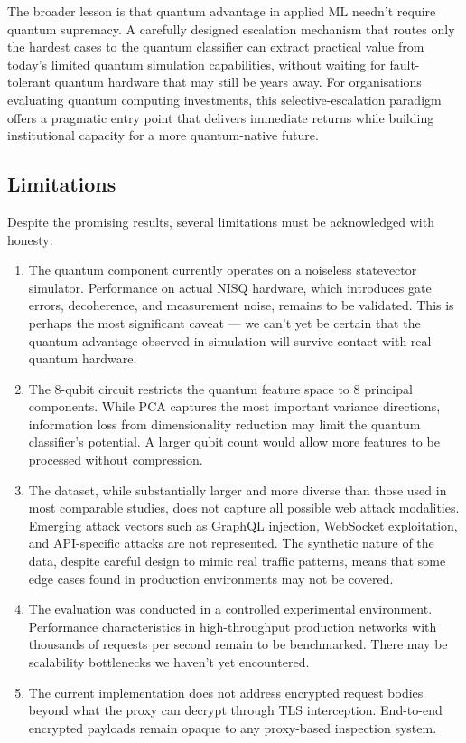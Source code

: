 \documentclass[journal,onecolumn]{IEEEtran}
\begin{document}
The broader lesson is that quantum advantage in applied ML needn't require quantum supremacy. A carefully designed escalation mechanism that routes only the hardest cases to the quantum classifier can extract practical value from today's limited quantum simulation capabilities, without waiting for fault-tolerant quantum hardware that may still be years away. For organisations evaluating quantum computing investments, this selective-escalation paradigm offers a pragmatic entry point that delivers immediate returns while building institutional capacity for a more quantum-native future.

\subsection{Limitations}
Despite the promising results, several limitations must be acknowledged with honesty:

\begin{enumerate}
\item[(a)] The quantum component currently operates on a noiseless statevector simulator. Performance on actual NISQ hardware, which introduces gate errors, decoherence, and measurement noise, remains to be validated. This is perhaps the most significant caveat --- we can't yet be certain that the quantum advantage observed in simulation will survive contact with real quantum hardware.

\item[(b)] The 8-qubit circuit restricts the quantum feature space to 8 principal components. While PCA captures the most important variance directions, information loss from dimensionality reduction may limit the quantum classifier's potential. A larger qubit count would allow more features to be processed without compression.

\item[(c)] The dataset, while substantially larger and more diverse than those used in most comparable studies, does not capture all possible web attack modalities. Emerging attack vectors such as GraphQL injection, WebSocket exploitation, and API-specific attacks are not represented. The synthetic nature of the data, despite careful design to mimic real traffic patterns, means that some edge cases found in production environments may not be covered.

\item[(d)] The evaluation was conducted in a controlled experimental environment. Performance characteristics in high-throughput production networks with thousands of requests per second remain to be benchmarked. There may be scalability bottlenecks we haven't yet encountered.

\item[(e)] The current implementation does not address encrypted request bodies beyond what the proxy can decrypt through TLS interception. End-to-end encrypted payloads remain opaque to any proxy-based inspection system.
\end{enumerate}
\end{document}
